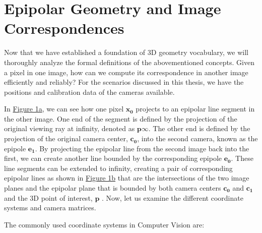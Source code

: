 \section{Epipolar Geometry and Image Correspondences}\label{sec:3dgeom}
Now that we have established a foundation of 3D geometry vocabulary, we will thoroughly analyze the formal definitions of the abovementioned concepts. Given a pixel in one image, how can we compute its correspondence in another image efficiently and reliably? For the scenarios discussed in this thesis, we have the positions and calibration data of the cameras available.\par
In  \hyperref[fig:epipolar]{Figure 1a}, we can see how one pixel $\mathbf{x_0}$ projects to an epipolar line segment in the other image. One end of the segment is defined by the projection of the original viewing ray at infinity, denoted as $\mathbf{p\infty}$. The other end is defined by the projection of the original camera center, $\mathbf{c_0}$, into the second camera, known as the epipole $\mathbf{e_1}$. By projecting the epipolar line from the second image back into the first, we can create another line bounded by the corresponding epipole $\mathbf{e_0}$. These line segments can be extended to infinity, creating a pair of corresponding epipolar lines as shown in  \hyperref[fig:epipolar]{Figure 1b} that are the intersections of the two image planes and the epipolar plane that is bounded by both camera centers $\mathbf{c_0}$ and $\mathbf{c_1}$ and the 3D point of interest, $\mathbf{p}$ \cite{Hartley2004}. Now, let us examine the different coordinate systems and camera matrices.\par
The commonly used coordinate systems in Computer Vision are:
